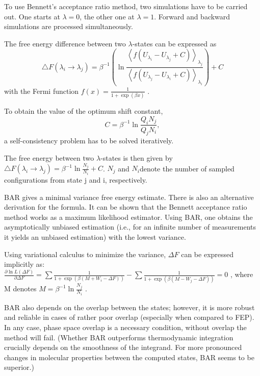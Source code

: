 To use Bennett's acceptance ratio method, two simulations have
to be carried out. One starts at $\lambda=0$, the other one at $\lambda=1$.
Forward and backward simulations are processed simultaneously. 

The free energy difference between two $\lambda$-states can be expressed as
\begin{equation}
\bigtriangleup F\left(\lambda_{i}\rightarrow\lambda_{j}\right)=\beta^{-1}\left(\ln\frac{\left\langle f\left(U_{\lambda_{i}}-U_{\lambda_{j}}+C\right)\right\rangle _{\lambda_{j}}}{\left\langle f\left(U_{\lambda_{j}}-U_{\lambda_{i}}+C\right)\right\rangle _{\lambda_{i}}}\right)+C
\end{equation}
with the Fermi function $f\left(x\right)=\frac{1}{1+\exp\left(\beta x\right)}$
\cite{Bruckner.2011,Gapsys.2015}.

To obtain the value of the optimum shift constant,
\begin{equation}
C=\beta^{-1}\ln\frac{Q_{i}N_{j}}{Q_{j}N_{i}},
\end{equation}
a self-consistency
problem has to be solved iteratively\cite{Gapsys.2015}.

The free energy between two $\lambda$-states is then given by $\bigtriangleup F\left(\lambda_{i}\rightarrow\lambda_{j}\right)=\beta^{-1}\ln\frac{N_{j}}{N_{i}}+C$\cite{Bruckner.2011}.
$N_{j}$ and $N_{i}$denote the number of sampled configurations from
state j and i, respectively.

BAR gives a minimal variance free energy estimate. There is also an
alternative derivation for the formula. It can be shown that the
Bennett acceptance ratio method works as a maximum likelihood estimator.
Using BAR, one obtains the asymptotically unbiased estimation (i.e., for an infinite
number of measurements it yields an unbiased estimation) 
with the lowest variance\cite{Shirts.2003}. 

Using variational calculus to minimize the variance, $\Delta F$ can
be expressed implicitly as:$\frac{\partial\ln L\left(\Delta F\right)}{\partial\Delta F}=\sum\frac{1}{1+\exp\left(\beta\left(M+W_{i}-\Delta F\right)\right)}-\sum\frac{1}{1+\exp\left(\beta\left(M-W_{j}-\Delta F\right)\right)}=0$
, where M denotes $M=\beta^{-1}\ln\frac{N_{j}}{N_{i}}$ \cite{Shirts.2003}.

BAR also depends on the overlap between the states; however, it is
more robust and reliable in cases of rather poor overlap \cite{Ruiter.2013}
(especially when compared to FEP). In any case, phase space overlap is a necessary condition, without overlap the method will fail. (Whether BAR outperforms thermodynamic
integration crucially depends on the smoothness of the integrand.
For more pronounced changes in molecular properties between the computed
states, BAR seems to be superior\cite{Shirts.2013}.)

